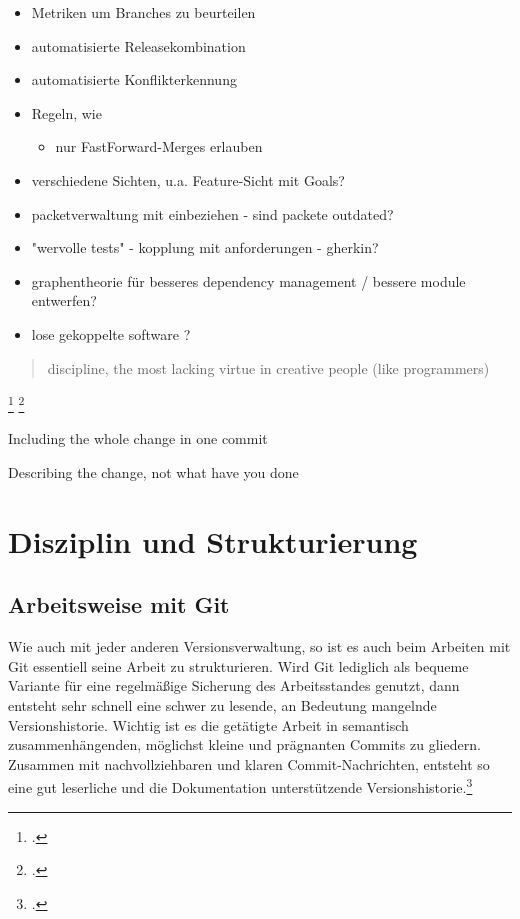 \begin{itemize}
\item Metriken um Branches zu beurteilen
\item automatisierte Releasekombination
\item automatisierte Konflikterkennung
\item Regeln, wie 
	\begin{itemize}
		\item nur FastForward-Merges erlauben
	\end{itemize}	 
\item verschiedene Sichten, u.a. Feature-Sicht mit Goals?
\item packetverwaltung mit einbeziehen - sind packete outdated?
\item "wervolle tests" - kopplung mit anforderungen - gherkin?
\item graphentheorie für besseres dependency management / bessere module entwerfen?
\item lose gekoppelte software ?
\end{itemize}

\blockquote {discipline, the most lacking virtue in creative people (like programmers)}
\footcite[Making only one change per commit][]{git-essentials-2017}
\footcite[Writing commit messages before starting to code][]{git-essentials-2017}

Including the whole change in one commit

Describing the change, not what have you done



\section{Disziplin und Strukturierung}
\subsection{Arbeitsweise mit Git}

Wie auch mit jeder anderen Versionsverwaltung, so ist es auch beim Arbeiten mit Git essentiell seine Arbeit zu strukturieren. Wird Git lediglich als bequeme Variante für eine regelmäßige Sicherung des Arbeitsstandes genutzt, dann entsteht sehr schnell eine schwer zu lesende, an Bedeutung mangelnde Versionshistorie. Wichtig ist es die getätigte Arbeit in semantisch zusammenhängenden, möglichst kleine und prägnanten Commits zu gliedern.
Zusammen mit nachvollziehbaren und klaren Commit-Nachrichten, entsteht so eine gut leserliche und die Dokumentation unterstützende Versionshistorie.\footcite[Making only one change per commit][]{git-essentials-2017}